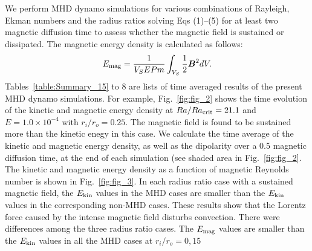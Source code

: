 {\color{red}
We perform MHD dynamo simulations for various combinations of Rayleigh, Ekman numbers and the radius ratios solving Eqs (1)--(5) for at least two magnetic diffusion time to assess whether the magnetic field is sustained or dissipated.
}
The magnetic energy density is calculated as follows:
%
\begin{equation}
E_{\rm mag} = \frac{1}{V_{S}E Pm} \int_{V_{S}} \frac{1}{2} \mbox{\boldmath$B$}^{2} dV.
\label{eq:magnetic_energy}
\end{equation}
%
{\color{blue} Tables~\ref{table:Summary_15} to 8 are lists of time averaged results of the present MHD dynamo simulations.
}
{\color{blue} For example, Fig.~\ref{fig:fig_2} shows the time evolution of the kinetic and magnetic energy density at $Ra/Ra_{\rm crit} = 21.1$ and $E = 1.0 \times 10^{-4}$ with $r_i/r_o = 0.25$.
The magnetic field is found to be sustained more than the kinetic enegy in this case.
}
We calculate the time average of the kinetic and magnetic energy density, as well as the dipolarity over a 0.5 magnetic diffusion time, at the end of each simulation (see shaded area in Fig.~\ref{fig:fig_2}.
{\color{red} %
The kinetic and magnetic energy density as a function of magnetic Reynolds number is shown in Fig.~\ref{fig:fig_3}.
}
In each radius ratio case with a sustained magnetic field, the $E_{\rm kin}$ values in the MHD cases are smaller than the $E_{\rm kin}$ values in the corresponding non-MHD cases. 
These results show that the Lorentz force caused by the intense magnetic field disturbs convection.
There were differences among the three radius ratio cases. 
{\color{red} %
The $E_{\rm mag}$ values are smaller than the $E_{\rm kin}$ values in all the MHD cases at $r_i / r_o = 0,15$
}
